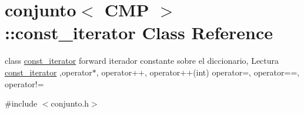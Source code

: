 \hypertarget{classconjunto_1_1const__iterator}{}\section{conjunto$<$ C\+M\+P $>$\+:\+:const\+\_\+iterator Class Reference}
\label{classconjunto_1_1const__iterator}


class \hyperlink{classconjunto_1_1const__iterator}{const\+\_\+iterator} forward iterador constante sobre el diccionario, Lectura \hyperlink{classconjunto_1_1const__iterator}{const\+\_\+iterator} ,operator$\ast$, operator++, operator++(int) operator=, operator==, operator!=  




{\ttfamily \#include $<$conjunto.\+h$>$}

